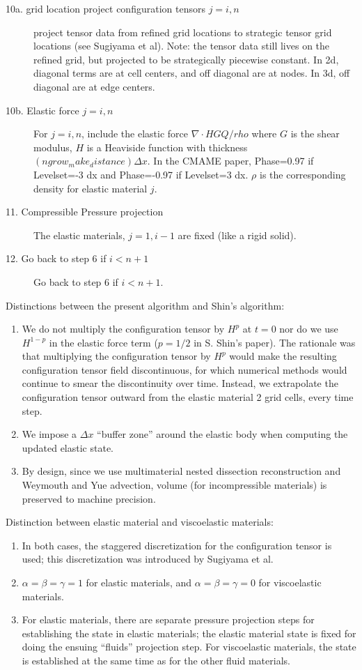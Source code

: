 \documentclass{beamer}
\begin{document}
\begin{description}
\item[10a. grid location project configuration tensors $j=i,n$] 
  project tensor data
  from refined grid locations to strategic tensor grid locations
  (see Sugiyama et al). Note: the tensor data still lives on the refined
  grid, but projected to be strategically piecewise constant.
  In 2d, diagonal terms are at cell centers, and off diagonal are at nodes.
  In 3d, off diagonal are at edge centers.
\item[10b. Elastic force $j=i,n$] For $j=i,n$, include the elastic force
  $\nabla\cdot H G Q/rho$ where $G$ is the shear modulus, $H$ is a 
  Heaviside function with thickness $(ngrow_make_distance)\Delta x$.
  In the CMAME paper, Phase=0.97 if Levelset=-3 dx and Phase=-0.97 if 
  Levelset=3 dx.
  $\rho$ is the corresponding density for elastic material $j$.  
\item[11. Compressible Pressure projection] The elastic materials, 
  $j=1,i-1$ are fixed (like a rigid solid).
\item[12. Go back to step 6 if $i<n+1$] Go back to step 6 if $i<n+1$.
\end{description}
Distinctions between the present algorithm and Shin's algorithm: 
\begin{enumerate}
\item We do not multiply the configuration tensor by $H^{p}$ at $t=0$
  nor do we use $H^{1-p}$ in the elastic force term ($p=1/2$ in
  S. Shin's paper).  The rationale was that
  multiplying the configuration tensor by $H^{p}$ would make the 
  resulting configuration tensor field discontinuous, for which 
  numerical methods would continue to smear the discontinuity over time.
  Instead, we extrapolate the configuration tensor outward from the 
  elastic material 2 grid cells, every time step.
\item We impose a $\Delta x$ ``buffer zone'' around the elastic body
  when computing the updated elastic state.  
\item By design, since we use multimaterial nested dissection reconstruction
  and Weymouth and Yue advection, volume (for incompressible materials) is
  preserved to machine precision.
\end{enumerate}
Distinction between elastic material and viscoelastic materials:
\begin{enumerate}
\item In both cases, the staggered discretization for the configuration tensor
  is used; this discretization was introduced by Sugiyama et al.
\item $\alpha=\beta=\gamma=1$ for elastic materials, and 
  $\alpha=\beta=\gamma=0$ for viscoelastic materials. 
\item For elastic materials, there are separate pressure projection steps for
  establishing the state in elastic materials; the elastic material
  state is fixed for doing the ensuing ``fluids'' projection step.
  For viscoelastic materials, the state is established at the same time as
  for the other fluid materials.
\end{enumerate}
\end{document}

